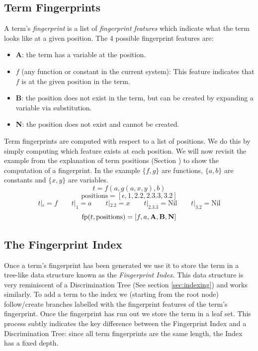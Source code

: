 \subsection{Term Fingerprints}
\label{sec:fingerprints}

A term's \emph{fingerprint} is a list of \emph{fingerprint features} which
indicate what the term looks like at a given position. The 4 possible
fingerprint features are:
\begin{itemize}
\item \textbf{A}: the term has a variable at the position.
\item $f$ (any function or constant in the current system): This
feature indicates that $f$ is at the given position in the term.
\item \textbf{B}: the position does not exist in the term, but can be created
by expanding a variable via substitution.
\item \textbf{N}: the position does not exist and cannot be created.
\end{itemize}
Term fingerprints are computed with respect to a list of positions. We do this by simply
computing which feature exists at each position. We will now revisit the example from
the explanation of term positions (Section \label{sec:terminology}) to show
the computation of a fingerprint. In the example $\{f,g\}$ are functions, $\{a,b\}$ are
constants and $\{x,y\}$ are variables.
\[t = f(a, g(a, x, y), b)\]
\[\text{positions} = [\epsilon, 1, 2.2, 2.3.3, 3.2] \]
\[t|_{\epsilon} = f \quad\quad t|_{1} = a \quad\quad  t|_{2.2} = x \quad\quad  t|_{2.3.3} = \text{Nil} \quad\quad  t|_{3.2} = \text{Nil}\]
\[\text{fp}(t, \text{positions}) = [f, a, \textbf{A}, \textbf{B}, \textbf{N}] \]

\subsection{The Fingerprint Index}
\label{sec:fpindex}

Once a term's fingerprint has been generated we use it to store the term in a tree-like
data structure known as the \emph{Fingerprint Index}. 
This data structure is very reminiscent of a Discrimination Tree (See section \ref{sec:indexing})
and works similarly. To add a term to the index we (starting from the root node) follow/create
branches labelled with the fingerprint features of the term's fingerprint. Once the fingerprint has run
out we store the term in a leaf set. This process subtly indicates the key difference
between the Fingerprint Index and a Discrimination Tree: since all term fingerprints
are the same length, the Index has a fixed depth.

